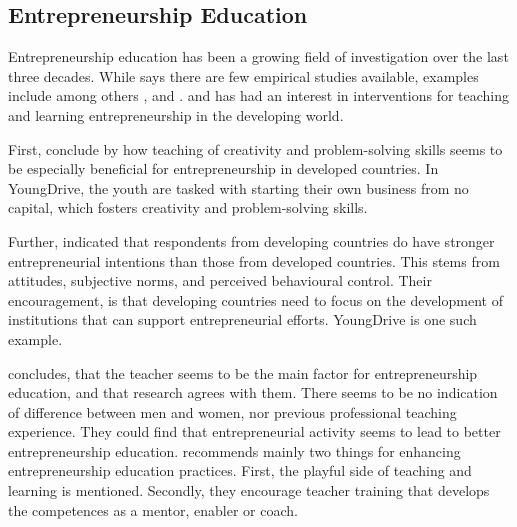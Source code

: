 \subsection{Entrepreneurship Education}

%

%




Entrepreneurship education has been a growing field of investigation over the last three decades. While \cite{dickson} says there are few empirical studies available, examples include among others \cite{kuratko}, \cite{pittaway} and \cite{bae}. \cite{oviawe} and \cite{iakovleva} has had an interest in interventions for teaching and learning entrepreneurship in the developing world.



First, \cite{oviawe} conclude by how teaching of creativity and problem-solving skills seems to be especially beneficial for entrepreneurship in developed countries. In YoungDrive, the youth are tasked with starting their own business from no capital, which fosters creativity and problem-solving skills.

Further, \cite{iakovleva} indicated that respondents from developing countries do have stronger entrepreneurial intentions than those from developed countries. This stems from attitudes, subjective norms, and perceived behavioural control. Their encouragement, is that developing countries need to focus on the development of institutions that can support entrepreneurial efforts. YoungDrive is one such example.

\cite{ruskovaara} concludes, that the teacher seems to be the main factor for entrepreneurship education, and that research agrees with them. There seems to be no indication of difference between men and women, nor previous professional teaching experience. They could find that entrepreneurial activity seems to lead to better entrepreneurship education. \cite{dickson} recommends mainly two things for enhancing entrepreneurship education practices. First, the playful side of teaching and learning is mentioned. Secondly, they encourage teacher training that develops the competences as a mentor, enabler or coach.
